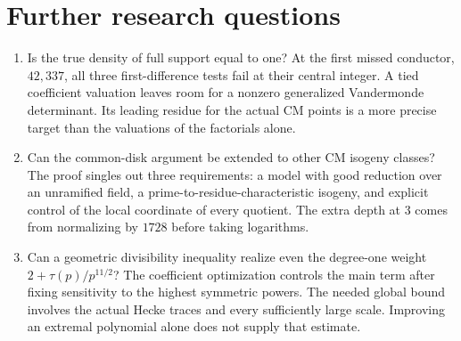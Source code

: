 \documentclass[11pt]{article}
\begin{document}



\section{Further research questions}
\begin{enumerate}
\item Is the true density of full support equal to one? At the first missed conductor, $42{,}337$, all three first-difference tests fail at their central integer. A tied coefficient valuation leaves room for a nonzero generalized Vandermonde determinant. Its leading residue for the actual CM points is a more precise target than the valuations of the factorials alone.
\item Can the common-disk argument be extended to other CM isogeny classes? The proof singles out three requirements: a model with good reduction over an unramified field, a prime-to-residue-characteristic isogeny, and explicit control of the local coordinate of every quotient. The extra depth at $3$ comes from normalizing by $1728$ before taking logarithms.
\item Can a geometric divisibility inequality realize even the degree-one weight $2+\tau(p)/p^{11/2}$? The coefficient optimization controls the main term after fixing sensitivity to the highest symmetric powers. The needed global bound involves the actual Hecke traces and every sufficiently large scale. Improving an extremal polynomial alone does not supply that estimate.
\end{enumerate}
\end{document}
